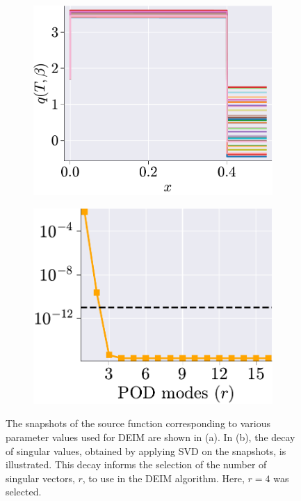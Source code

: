 \documentclass[11pt]{article}
\begin{document}
        \begin{figure}[t]
            \centering
            \begin{subfigure}[b]{0.45\linewidth}
                \centering
                \includegraphics[width=\linewidth]{DEIM_snapshots.pdf}
                \caption{}
                \label{fig:DEIM_snap_a}
            \end{subfigure}
            \begin{subfigure}[b]{0.45\linewidth}
                \centering
                \includegraphics[width=0.97\linewidth]{DEIM_SVs.pdf}
                \caption{}
                \label{fig:DEIM_snap_b}
            \end{subfigure}
            \caption{The snapshots of the source function corresponding to various parameter values used for DEIM are shown in (a).
            In (b), the decay of singular values, obtained by applying SVD on the snapshots, is illustrated.
            This decay informs the selection of the number of singular vectors, \( r \), to use in the DEIM algorithm.
            Here, \( r = 4 \) was selected.}
            \label{fig:DEIM_snap}
        \end{figure}
\end{document}
